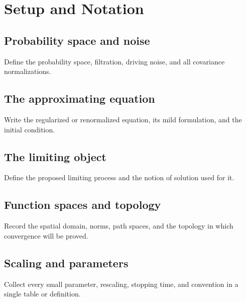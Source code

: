 \section{Setup and Notation}

\subsection{Probability space and noise}

\begin{draftnote}
Define the probability space, filtration, driving noise, and all covariance
normalizations.
\end{draftnote}

\subsection{The approximating equation}

\begin{draftnote}
Write the regularized or renormalized equation, its mild formulation, and the
initial condition.
\end{draftnote}

\subsection{The limiting object}

\begin{draftnote}
Define the proposed limiting process and the notion of solution used for it.
\end{draftnote}

\subsection{Function spaces and topology}

\begin{draftnote}
Record the spatial domain, norms, path spaces, and the topology in which
convergence will be proved.
\end{draftnote}

\subsection{Scaling and parameters}

\begin{draftnote}
Collect every small parameter, rescaling, stopping time, and convention in a
single table or definition.
\end{draftnote}
